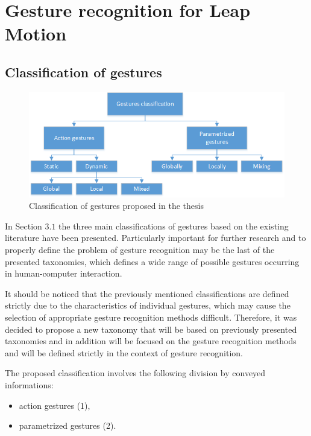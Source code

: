 \chapter{Gesture recognition for Leap Motion}

\section{Classification of gestures}

\begin{figure}[htb]
\centering
 \includegraphics[width=0.8\columnwidth]{figures/gestureClassification.png}
 \caption[]{Classification of gestures proposed in the thesis}
 \label{thesisgesturetypes}
\end{figure}

In Section $3.1$ the three main classifications of gestures based on the existing literature have been presented. Particularly important for further research and to properly define the problem of gesture recognition may be the last of the presented taxonomies, which defines a wide range of possible gestures occurring in human-computer interaction.

It should be noticed that the previously mentioned classifications are defined strictly due to the characteristics of individual gestures, which may cause the selection of appropriate gesture recognition methods difficult. Therefore, it was decided to propose a new taxonomy that will be based on previously presented taxonomies \cite{kammer_taxonomy_2010}\cite{Karam05ataxonomy}\cite{AignerTaxonomy} and in addition will be focused on the gesture recognition methods and will be defined strictly in the context of gesture recognition.

The proposed classification involves the following division by conveyed informations:
\begin{itemize}
\item action gestures (1),
\item parametrized gestures (2).
\end{itemize}

